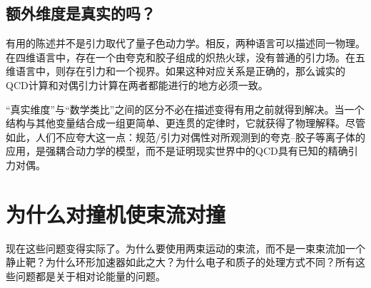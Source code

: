 \subsection{额外维度是真实的吗？}

\begin{classroomqa}
\end{classroomqa}

有用的陈述并不是引力取代了量子色动力学。相反，两种语言可以描述同一物理。在四维语言中，存在一个由夸克和胶子组成的炽热火球，没有普通的引力场。在五维语言中，则存在引力和一个视界。如果这种对应关系是正确的，那么诚实的QCD计算和对偶引力计算在两者都能进行的地方必须一致。

\begin{classroomqa}
\end{classroomqa}

``真实维度''与``数学类比''之间的区分不必在描述变得有用之前就得到解决。当一个结构与其他变量结合成一组更简单、更连贯的定律时，它就获得了物理解释。尽管如此，人们不应夸大这一点：规范/引力对偶性对所观测到的夸克--胶子等离子体的应用，是强耦合动力学的模型，而不是证明现实世界中的QCD具有已知的精确引力对偶。

\section{为什么对撞机使束流对撞}

现在这些问题变得实际了。为什么要使用两束运动的束流，而不是一束束流加一个静止靶？为什么环形加速器如此之大？为什么电子和质子的处理方式不同？所有这些问题都是关于相对论能量的问题。

\begin{classroomqa}
\end{classroomqa}

